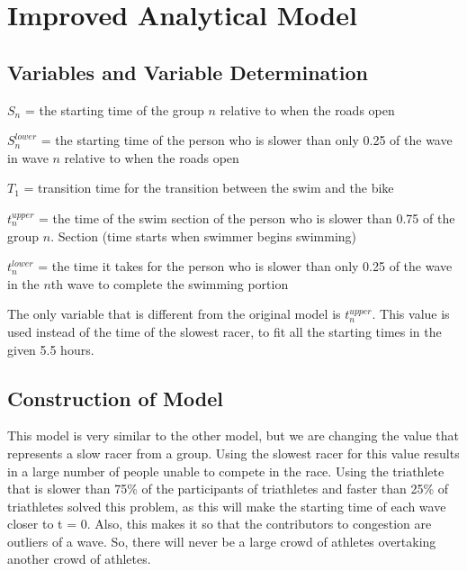 \documentclass[12pt]{article}
\begin{document}
\section{Improved Analytical Model}
\subsection{Variables and Variable Determination}
\(S_{n}\) = the starting time of the group $n$ relative to when the roads open\vspace{2ex} \par \noindent 
\(S_n^{lower}\) = the starting time of the person who is slower than only 0.25 of the wave in wave $n$ relative to when the roads open\vspace{2ex} \par \noindent 
\(T_1\) = transition time for the transition between the swim and the bike\vspace{2ex} \par \noindent
\(t_n^{upper}\) = the time of the swim section of the person who is slower than 0.75 of the group $n$. Section (time starts when swimmer begins swimming)\vspace{2ex} \par \noindent
\(t_n^{lower}\) = the time it takes for the person who is slower than only 0.25 of the wave in the $n$th wave to complete the swimming portion\par \vspace{2ex}
\noindent
The only variable that is different from the original model is $t_n^{upper}$. This value is used instead of the time of the slowest racer, to fit all the starting times in the given 5.5 hours.
\subsection{Construction of Model}
This model is very similar to the other model, but we are changing the value that represents a slow racer from a group. Using the slowest racer for this value results in a large number of people unable to compete in the race. Using the triathlete that is slower than 75\% of the participants of triathletes and faster than 25\% of triathletes solved this problem, as this will make the starting time of each wave closer to t = 0. Also, this makes it so that the contributors to congestion are outliers of a wave. So, there will never be a large crowd of athletes overtaking another crowd of athletes.
\end{document}
